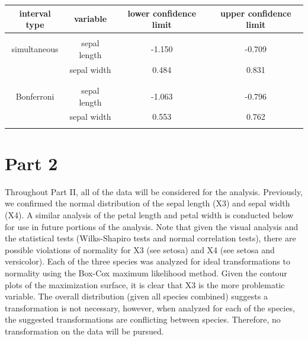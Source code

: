 \begin{enumerate}
\begin{center}
\begin{tabular}{| c c c c |} 
	\hline
	interval type & variable & lower confidence limit & upper confidence limit \\
	\hline
	&&&\\
	simultaneous & sepal length & -1.150 & -0.709 \\
	  & sepal width & 0.484 & 0.831 \\
	&&&\\
	\hline
	&&&\\
	Bonferroni & sepal length & -1.063 & -0.796 \\
	  & sepal width & 0.553 & 0.762 \\
	&&&\\
	\hline
\end{tabular}
\end{center}

\end{enumerate}

\newpage
\section*{Part 2}
	Throughout Part II, all of the data will be considered for the analysis. Previously, we confirmed the normal distribution of the sepal length (X3) and sepal width (X4). A similar analysis of the petal length and petal width is conducted below for use in future portions of the analysis. Note that given the visual analysis and the statistical tests (Wilks-Shapiro tests and normal correlation tests), there are possible violations of normality for X3 (see setosa) and X4 (see setosa and versicolor). Each of the three species was analyzed for ideal transformations to normality using the Box-Cox maximum likelihood method. Given the contour plots of the maximization surface, it is clear that X3 is the more problematic variable. The overall distribution (given all species combined) suggests a transformation is not necessary, however, when analyzed for each of the species, the suggested transformations are conflicting between species. Therefore, no transformation on the data will be pursued.

